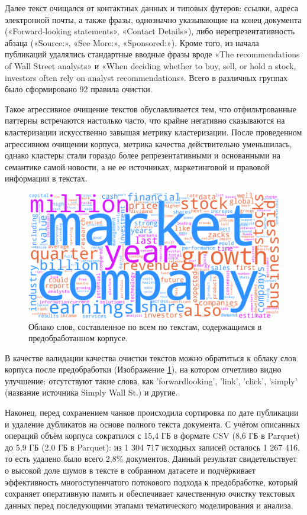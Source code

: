 Далее текст очищался от контактных данных и типовых футеров: ссылки, адреса электронной почты, а также фразы,
однозначно указывающие на конец документа («Forward-looking statements», «Contact Details»), либо нерепрезентативность
абзаца («Source:», «See More:», «Sponsored:»). Кроме того, из начала публикаций удалялись стандартные вводные фразы вроде
«The recommendations of Wall Street analysts» и «When deciding whether to buy, sell, or hold a stock, investors often
rely on analyst recommendations». Всего в различных группах было сформировано 92 правила очистки.

Такое агрессивное очищение текстов обуславливается тем, что отфильтрованные паттерны встречаются настолько часто,
что крайне негативно сказываются на кластеризации искусственно завышая метрику кластеризации. После проведенном
агрессивном очищении корпуса, метрика качества действительно уменьшилась, однако кластеры стали гораздо более
репрезентативными и основанными на семантике самой новости, а не ее источниках, маркетинговой и правовой информации
в текстах.

\begin{figure}[H]
    \centering
    \includegraphics[width=1\linewidth]{img/prep_wordcloud.png}
    \caption{\label{fig:prep_wordcloud} Облако слов, составленное по всем по текстам, содержащимся в предобработанном корпусе.}
\end{figure}

В качестве валидации качества очистки текстов можно обратиться к облаку слов корпуса после предобработки (Изображение \ref{fig:prep_wordcloud}),
на котором отчетливо видно улучшение: отсутствуют такие слова, как 'forwardlooking', 'link', 'click', 'simply' (название источника Simply Wall St.) и другие.

Наконец, перед сохранением чанков происходила сортировка по дате публикации и удаление дубликатов на основе полного текста документа.
С учётом описанных операций объём корпуса сократился с 15,4 ГБ в формате CSV (8,6 ГБ в Parquet) до 5,9 ГБ (2,0 ГБ в Parquet): из 1 304 717
исходных записей осталось 1 267 416, то есть удалено было всего 2,8\% документов. Данный результат свидетельствует о высокой
доле шумов в тексте в собранном датасете и подчёркивает эффективность многоступенчатого потокового подхода к предобработке,
который сохраняет оперативную память и обеспечивает качественную очистку текстовых данных перед последующими этапами
тематического моделирования и анализа.
